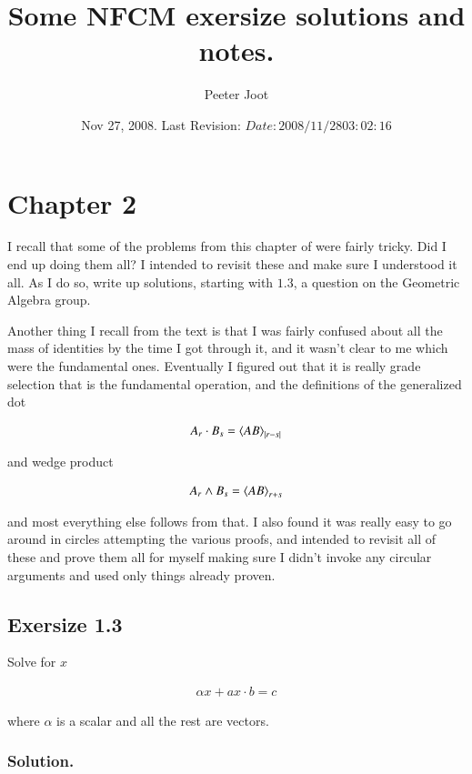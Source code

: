 \documentclass{article}
\title{ Some NFCM exersize solutions and notes. }
\author{Peeter Joot}
\date{ Nov 27, 2008.  Last Revision: $Date: 2008/11/28 03:02:16 $ }
\begin{document}
\maketitle{}

\section{ Chapter 2 }

I recall that some of the problems from this chapter of
\cite{hestenes1999nfc}
were fairly tricky.  Did I end up doing them all?  I intended to
revisit these and make sure I understood it all.  As I do so, write up
solutions, starting with $1.3$, a question on the Geometric Algebra group.

Another thing I recall from the text is that I was fairly confused about
all the mass of identities by the time I got through it, and it wasn't clear
to me which were the fundamental ones.
Eventually I figured out that it is
really grade selection that is the fundamental operation, and the
definitions of the generalized dot

\begin{align*}
A_r \cdot B_s = {\left\langle{{A B}}\right\rangle}_{{\left\lvert{r -s}\right\rvert}}
\end{align*}

and wedge product

\begin{align*}
A_r \wedge B_s = {\left\langle{{A B}}\right\rangle}_{r + s}
\end{align*}

and most everything else
follows from that.
I also found it was really easy to go around in circles attempting the various proofs, and intended to revisit all of these
and prove them all for myself making sure I didn't invoke any circular arguments and used only things already proven.

\subsection{ Exersize 1.3 }

Solve for $x$

\begin{align*}
\alpha x + a x \cdot b = c
\end{align*}

where $\alpha$ is a scalar and all the rest are vectors.

\subsubsection{ Solution. }
\end{document}
